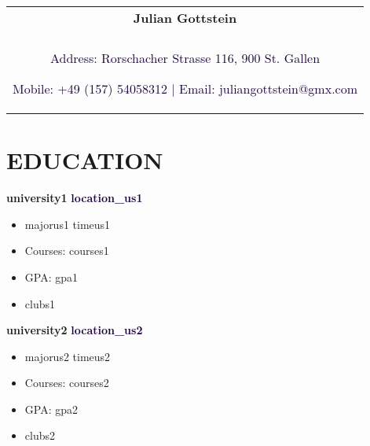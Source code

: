 \documentclass[a4paper,8pt]{article}
\begin{document}
\pagestyle{empty}


\begin{tabularx}{\linewidth}{@{} C @{}}
    \color[HTML]{1C033C} \Huge{\textbf{Julian Gottstein}} \\[6pt]
    \\
    \textcolor[HTML]{1C033C}{Address: Rorschacher Strasse 116, 900 St. Gallen}

    \textcolor[HTML]{1C033C}{Mobile: +49 (157) 54058312 $|$}
    \textcolor[HTML]{1C033C}{Email: juliangottstein@gmx.com}
\end{tabularx}

\section{EDUCATION}
\textbf{university1} \hfill \textbf{\textcolor[HTML]{1C033C}{location\_us1}}\\[-3ex]
\begin{itemize}[label={\large\textbullet}, left=0pt, itemsep=0.5ex, parsep=0.5ex]
    \item majorus1 \hfill \color[HTML]{1C033C} timeus1 \\[-3ex]
\end{itemize}
\begin{itemize}[label=$\circ$,itemsep=0.5ex,parsep=0.5ex]
    \item Courses: courses1
    \item GPA: gpa1
    \item clubs1
\end{itemize}

\textbf{university2} \hfill \textbf{\textcolor[HTML]{1C033C}{location\_us2}}\\[-3ex]
\begin{itemize}[label={\large\textbullet}, left=0pt, itemsep=0.5ex, parsep=0.5ex]
    \item majorus2 \hfill \color[HTML]{1C033C} timeus2 \\[-3ex]
\end{itemize}
\begin{itemize}[label=$\circ$,itemsep=0.5ex,parsep=0.5ex]
    \item Courses: courses2
    \item GPA: gpa2
    \item clubs2
\end{itemize}

\end{document}
